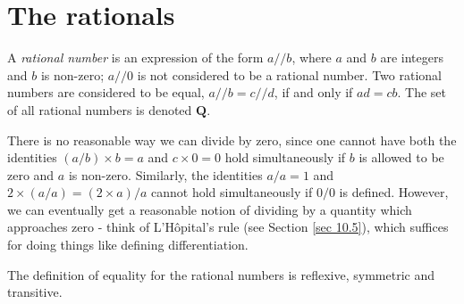 \section{The rationals}\label{sec 4.2}

\begin{definition}\label{4.2.1}
    A \emph{rational number} is an expression of the form \(a // b\), where \(a\) and \(b\) are integers and \(b\) is non-zero;
    \(a // 0\) is not considered to be a rational number.
    Two rational numbers are considered to be equal, \(a // b = c // d\), if and only if \(ad = cb\).
    The set of all rational numbers is denoted \(\mathbf{Q}\).
\end{definition}

\begin{note}
    There is no reasonable way we can divide by zero, since one cannot have both the identities \((a / b) \times b = a\) and \(c \times 0 = 0\) hold simultaneously if \(b\) is allowed to be zero and \(a\) is non-zero.
    Similarly, the identities \(a / a = 1\) and \(2 \times (a / a) = (2 \times a) / a\) cannot hold simultaneously if \(0 / 0\) is defined.
    However, we can eventually get a reasonable notion of dividing by a quantity which approaches zero
    - think of L'H\^opital's rule (see Section \ref{sec 10.5}), which suffices for doing things like defining differentiation.
\end{note}

\begin{additional corollary}\label{ac 4.2.1}
The definition of equality for the rational numbers is reflexive, symmetric and transitive.
\end{additional corollary}

